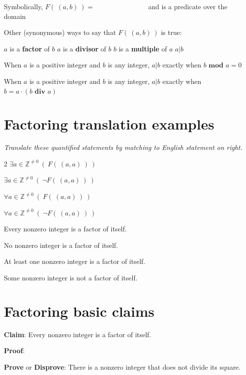 \documentclass[12pt, oneside]{article}
\begin{document}
Symbolically, $F(~(a,b)~) = \phantom{\exists c\in \mathbb{Z}~(b=ac)}$
and is  a predicate over the domain \underline{}


Other (synonymous) ways to say that $F(~(a,b)~)$ is true: 
\begin{center}
$a$ is a {\bf factor} of $b$
\qquad 
$a$ is a {\bf divisor} of $b$
\qquad  $b$ is a {\bf multiple} of $a$
\qquad
$a | b$
\end{center}

When $a$ is a positive integer and $b$ is any integer, $a | b$
exactly when $b \textbf{ mod } a = 0$

When $a$ is a positive integer and $b$ is any integer, $a | b$
exactly when $b = a \cdot (b \textbf{ div } a)$ \vfill
\section*{Factoring translation examples}


{\it Translate these quantified statements by matching to English statement on right.}

\begin{multicols}{2}
$\exists a\in \mathbb{Z}^{\neq 0} ~(~F(~(a,a)~)~)$

$\exists a\in \mathbb{Z}^{\neq 0} ~(~\lnot F(~(a,a)~)~)$

$\forall a\in \mathbb{Z}^{\neq 0} ~(~F(~(a,a)~)~)$

$\forall a\in \mathbb{Z}^{\neq 0} ~(~\lnot F(~(a,a)~)~)$


Every nonzero integer is a factor of itself.

No nonzero integer is a factor of itself.

At least one nonzero integer is a factor of itself.

Some nonzero integer is not a factor of itself.
\end{multicols} \vfill
\section*{Factoring basic claims}


{\bf Claim}: Every nonzero integer is a factor of itself.

{\bf Proof}: 


\vfill

{\bf Prove} or {\bf Disprove}: There is a nonzero integer that does not divide its square.



\vfill
\end{document}
